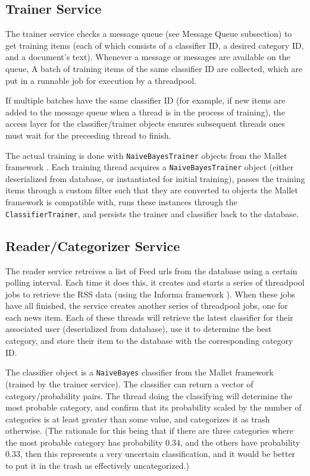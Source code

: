 \documentclass[letterpaper]{article}
\begin{document}
\subsection{Trainer Service}
The trainer service checks a message queue (see Message Queue subsection) to get training items (each of which consists of a classifier ID, a desired category ID, and a document's text).
Whenever a message or messages are available on the queue, A batch of training items of the same classifier ID are collected, which are put in a runnable job for execution by a threadpool.

If multiple batches have the same classifier ID (for example, if new items are added to the message queue when a thread is in the process of training), the access layer for the classifier/trainer objects ensures subsequent threads ones must wait for the preceeding thread to finish.

The actual training is done with \texttt{NaiveBayesTrainer} objects from the Mallet framework \cite{McCallumMALLET}.
Each training thread acquires a \texttt{NaiveBayesTrainer} object (either deserialized from database, or instantiated for initial training),
passes the training items through a custom filter such that they are converted to objects the Mallet framework is compatible with,
runs these instances through the \texttt{ClassifierTrainer},
and persists the trainer and classifier back to the database.

\subsection{Reader/Categorizer Service}
The reader service retreives a list of Feed urls from the database using a certain polling interval. Each time it does this, it creates and starts a series of threadpool jobs to retrieve the RSS data (using the Informa framework \cite{Informa}). When these jobs have all finished, the service creates another series of threadpool jobs, one for each news item. Each of these threads will retrieve the latest classifier for their associated user (deserialized from database), use it to determine the best category, and store their item to the database with the corresponding category ID.

The classifier object is a \texttt{NaiveBayes} classifier from the Mallet framework (trained by the trainer service). The classifier can return a vector of category/probability pairs. The thread doing the classifying will determine the most probable category, and confirm that its probability scaled by the number of categories is at least greater than some value, and categorizes it as trash otherwise. (The rationale for this being that if there are three categories where the most probable category has probability 0.34, and the others have probability 0.33, then this represents a very uncertain classification, and it would be better to put it in the trash as effectively uncategorized.)
\end{document}
